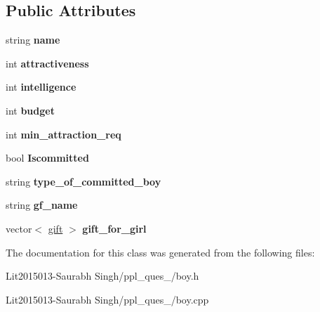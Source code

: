 \subsection*{Public Attributes}
\begin{DoxyCompactItemize}
\item 
\mbox{\label{classboy_abcc2bcb0cb3f0465f5001e549a14a861}} 
string {\bfseries name}
\item 
\mbox{\label{classboy_a8fff0880998598f79dc602a4345f0c67}} 
int {\bfseries attractiveness}
\item 
\mbox{\label{classboy_a3f66ab5d6e4d99adce1a8d33a4f2fb82}} 
int {\bfseries intelligence}
\item 
\mbox{\label{classboy_a80d6bd6642a612cf0428ab56a2098316}} 
int {\bfseries budget}
\item 
\mbox{\label{classboy_a363e2d52a8f745aa5650ddc0007a323c}} 
int {\bfseries min\+\_\+attraction\+\_\+req}
\item 
\mbox{\label{classboy_a9eb8c2ade29520aec69b21ed659194bf}} 
bool {\bfseries Iscommitted}
\item 
\mbox{\label{classboy_abc7775597e8f8f89b44164bab24d188a}} 
string {\bfseries type\+\_\+of\+\_\+committed\+\_\+boy}
\item 
\mbox{\label{classboy_ad15ed51808a67b109dd390a32d0ba87e}} 
string {\bfseries gf\+\_\+name}
\item 
\mbox{\label{classboy_aca48a8243dd8e9a2339e7a2c5852c4e8}} 
vector$<$ \hyperlink{classgift}{gift} $>$ {\bfseries gift\+\_\+for\+\_\+girl}
\end{DoxyCompactItemize}


The documentation for this class was generated from the following files\+:\begin{DoxyCompactItemize}
\item 
Lit2015013-\/\+Saurabh Singh/ppl\+\_\+ques\+\_/boy.\+h\item 
Lit2015013-\/\+Saurabh Singh/ppl\+\_\+ques\+\_/boy.\+cpp\end{DoxyCompactItemize}
